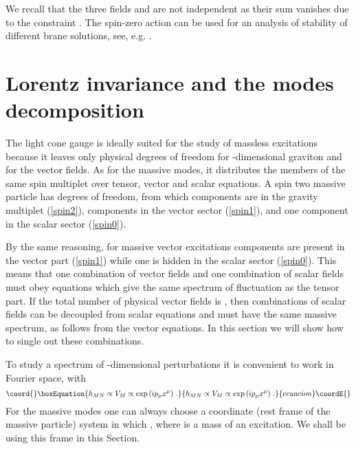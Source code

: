 \documentclass[a4paper,12pt]{article}
\begin{document}
We recall that the three fields \coordHE{} and \coordHE{}
are not independent as their sum vanishes due to the constraint
\coordHE{}. The spin-zero action can be used for an analysis of stability
of different brane solutions, see, e.g. \cite{Lavrelashvili:aa}.

\section{Lorentz invariance and the modes decomposition}

The light cone gauge is ideally suited for the study of massless
excitations because it leaves only  physical degrees of freedom for
\coordHE{}-dimensional graviton and for the vector fields. As for the
massive modes, it distributes the members of the same spin multiplet
over tensor, vector and scalar equations.   A spin two massive
particle has \coordHE{} degrees of freedom, from which
\coordHE{} components are in the gravity multiplet
(\ref{spin2}),  \coordHE{} components in the vector sector
(\ref{spin1}), and one component in the scalar sector (\ref{spin0}).

By the same reasoning, for massive vector excitations \coordHE{}
components are present in the vector part (\ref{spin1}) while one is
hidden in the scalar sector (\ref{spin0}). This means that one
combination of vector fields and one combination of scalar fields
must obey  equations which give the same spectrum of fluctuation  as
the tensor part. If the total number of physical vector fields is
\coordHE{}, then \coordHE{} combinations of scalar fields can be decoupled from
scalar equations and must have the same massive spectrum, as follows
from the vector equations. In this section we will show how to single
out these combinations.

To study a spectrum of \coordHE{}-dimensional perturbations it is
convenient to work in Fourier space, with
\begin{equation}\coord{}\boxEquation{
h_{MN} \propto V_{M} \propto  \exp{(i p_{\mu}x^{\mu})}~.
}{
h_{MN} \propto V_{M} \propto  \exp{(i p_{\mu}x^{\mu})}~.
}{ecuacion}\coordE{}\end{equation}
For the massive modes one can always choose a coordinate (rest frame
of the massive particle) system in which \coordHE{},
where \coordHE{} is a mass of an excitation. We shall be using this frame in
this Section.
\end{document}
